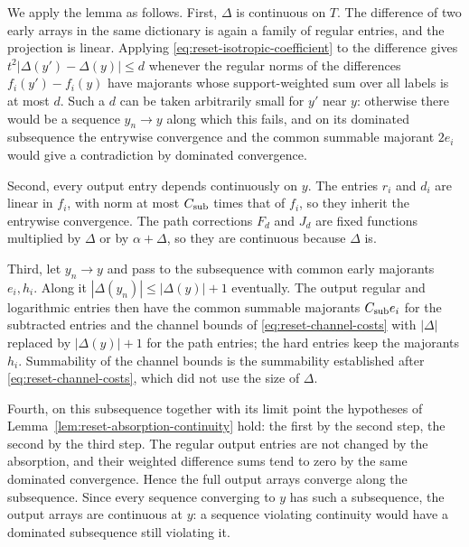 We apply the lemma as follows. First, $\Delta$ is continuous on $T$.
The difference of two early arrays in the same dictionary is again a
family of regular entries, and the projection is linear. Applying
\eqref{eq:reset-isotropic-coefficient} to the difference gives
$t^2|\Delta(y')-\Delta(y)|\le d$ whenever the regular norms of the
differences $f_i(y')-f_i(y)$ have majorants whose support-weighted
sum over all labels is at most $d$. Such a $d$ can be taken
arbitrarily small for $y'$ near $y$: otherwise there would be a
sequence $y_n\to y$ along which this fails, and on its dominated
subsequence the entrywise convergence and the common summable
majorant $2e_i$ would give a contradiction by dominated convergence.

Second, every output entry depends continuously on $y$. The entries
$r_i$ and $d_i$ are linear in $f_i$, with norm at most $C_{\rm sub}$
times that of $f_i$, so they inherit the entrywise convergence. The
path corrections $F_d$ and $J_d$ are fixed functions multiplied by
$\Delta$ or by $\alpha+\Delta$, so they are continuous because
$\Delta$ is.

Third, let $y_n\to y$ and pass to the subsequence with common early
majorants $e_i,h_i$. Along it $|\Delta(y_n)|\le|\Delta(y)|+1$
eventually. The output regular and logarithmic entries then have the
common summable majorants $C_{\rm sub}e_i$ for the subtracted entries
and the channel bounds of \eqref{eq:reset-channel-costs} with
$|\Delta|$ replaced by $|\Delta(y)|+1$ for the path entries; the hard
entries keep the majorants $h_i$. Summability of the channel
bounds is the summability established after
\eqref{eq:reset-channel-costs}, which did not use the size of
$\Delta$.

Fourth, on this subsequence together with its limit point the
hypotheses of Lemma~\ref{lem:reset-absorption-continuity} hold: the
first by the second step, the second by the third step. The regular output
entries are not changed by the absorption, and their weighted
difference sums tend to zero by the same dominated convergence.
Hence the full output arrays converge along the subsequence. Since
every sequence converging to $y$ has such a subsequence, the output
arrays are continuous at $y$: a sequence violating continuity would
have a dominated subsequence still violating it.

